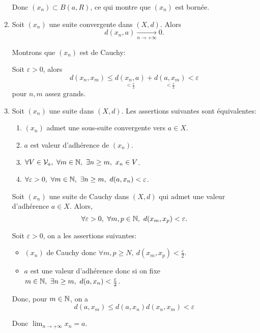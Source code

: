 \documentclass[french,a4paper,10pt]{article}
\begin{document}
\begin{myproof}
\begin{enumerate}
            Donc $(x_n)\subset B(a,R)$, ce qui montre que $(x_n)$ est bornée.

            \item Soit $(x_n)$ une suite convergente dans $(X,d)$.
            Alors
            \[
                d(x_n,a)\xrightarrow[n\to+\infty]{}0.
            \]

            Montrons que $(x_n)$ est de Cauchy:

            Soit $\varepsilon>0$, alors
            \[
            d(x_n,x_m)\leq \underset{<\frac\varepsilon2}{d(x_n,a)}+\underset{<\frac\varepsilon2}{d(a,x_m)}<\varepsilon
            \]
            pour $n,m$ assez grands.

            \item %
            \begin{lemme}[cf prochain TD]
                Soit $(x_n)$ une suite dans $(X,d)$. Les assertions suivantes sont équivalentes:
                \begin{enumerate}[label=$(\roman*)$]
                    \item $(x_n)$ admet une sous-suite convergente vers $a\in X$.
                    \item $a$ est valeur d'adhérence de $(x_n)$.
                    \item $\forall V\in \mathcal V_a,\ \forall m\in\mathbb{N},\ \exists n\geq m,\ x_n\in V$.
                    \item $\forall \varepsilon>0,\ \forall m\in\mathbb{N},\ \exists n\geq m,\ d(a, x_n)<\varepsilon$.
                \end{enumerate}
            \end{lemme}
            
            Soit $(x_n)$ une suite de Cauchy dans $(X,d)$ qui admet une valeur d'adhérence $a\in X$.
            Alors, 
            \[
                \forall \varepsilon>0,\ \forall m,p\in\mathbb{N},\ d(x_m,x_p)<\varepsilon.
            \]

            Soit $\varepsilon>0$, on a les assertions suivantes:
            \begin{itemize}
                \item $(x_n)$ de Cauchy donc $\forall m,p\ge N,\ d(x_m,x_p)<\frac\varepsilon2$.
                \item $a$ est une valeur d'adhérence donc si on fixe $m\in\bb N,\ \exists n\geq m,\ d(a,x_n)<\frac\varepsilon2$.
            \end{itemize}

            Donc, pour $m\in\mathbb{N}$, on a
            \[
                d(a,x_m)\leq d(a, x_n) d(x_n,x_m)<\varepsilon
            \]

            Donc $\lim_{n\to+\infty}x_n=a$.
        \end{enumerate}
    \end{myproof}
\end{document}
